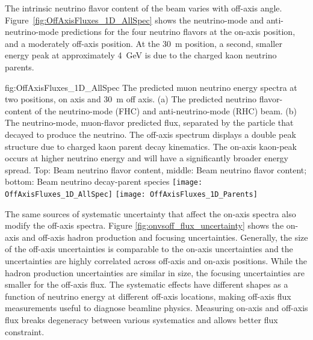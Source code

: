 The intrinsic neutrino flavor content of the beam varies with off-axis angle. Figure~\ref{fig:OffAxisFluxes_1D_AllSpec} shows the neutrino-mode and anti-neutrino-mode predictions for the four neutrino flavors at the on-axis position, and a moderately off-axis position. At the \SI{30}{m} position, a second, smaller energy peak at approximately \SI{4}{\GeV} is due to the charged kaon neutrino parents. 

\begin{dunefigure}{fig:OffAxisFluxes_1D_AllSpec}
{The predicted muon neutrino energy spectra at two  positions, on axis and \SI{30}{m} off axis. (a) The predicted neutrino flavor-content of the neutrino-mode (FHC) and anti-neutrino-mode (RHC) beam. (b) The neutrino-mode, muon-flavor predicted flux, separated by the particle that decayed to produce the neutrino. The off-axis spectrum displays a double peak structure due to charged kaon parent decay kinematics. The on-axis kaon-peak occurs at higher neutrino energy and will have a significantly broader energy spread. Top: Beam neutrino flavor content, middle: Beam neutrino flavor content; bottom: Beam neutrino decay-parent species}
    \texttt{[image: OffAxisFluxes\_1D\_AllSpec]}
  \texttt{[image: OffAxisFluxes\_1D\_Parents]}    
    \end{dunefigure}


The same sources of systematic uncertainty that affect the on-axis spectra also modify the off-axis spectra. 
Figure \ref{fig:onvsoff_flux_uncertainty} shows the on-axis and off-axis hadron production and focusing uncertainties. 
Generally, the size of the off-axis uncertainties is comparable to the on-axis uncertainties and the uncertainties are highly correlated across off-axis and on-axis positions. While the hadron production uncertainties are similar in size, the focusing uncertainties are smaller for the off-axis flux. The systematic effects have different shapes as a function of neutrino energy at different off-axis locations, making off-axis flux measurements useful to diagnose beamline physics. Measuring on-axis and off-axis flux breaks degeneracy between various systematics and allows better flux constraint.

